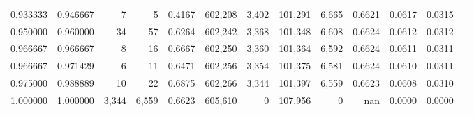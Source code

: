 \begin{tabular}{rrrrrrrrrrrrr}
0.933333 & 0.946667 &      7 &      5 &                                     0.4167 & 602,208 &   3,402 & 101,291 &   6,665 & 0.6621 & 0.0617 & 0.0315 \\
0.950000 & 0.960000 &     34 &     57 &                                     0.6264 & 602,242 &   3,368 & 101,348 &   6,608 & 0.6624 & 0.0612 & 0.0312 \\
0.966667 & 0.966667 &      8 &     16 &                                     0.6667 & 602,250 &   3,360 & 101,364 &   6,592 & 0.6624 & 0.0611 & 0.0311 \\
0.966667 & 0.971429 &      6 &     11 &                                     0.6471 & 602,256 &   3,354 & 101,375 &   6,581 & 0.6624 & 0.0610 & 0.0311 \\
0.975000 & 0.988889 &     10 &     22 &                                     0.6875 & 602,266 &   3,344 & 101,397 &   6,559 & 0.6623 & 0.0608 & 0.0310 \\
1.000000 & 1.000000 &  3,344 &  6,559 &                                     0.6623 & 605,610 &       0 & 107,956 &       0 &    nan & 0.0000 & 0.0000 \\
\bottomrule
\end{tabular}
